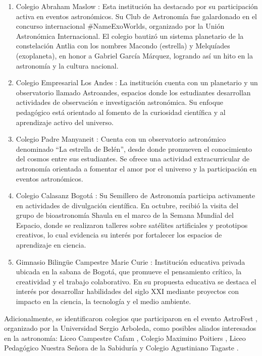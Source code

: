 \begin{enumerate}
  \item Colegio Abraham Maslow \cite{maslowweb}:
    Esta institución ha destacado por su participación activa en eventos
    astronómicos.
    Su Club de Astronomía fue galardonado en el concurso internacional
    \#NameExoWorlds, organizado por la Unión Astronómica Internacional.
    El colegio bautizó un sistema planetario de la constelación Antlia con los
    nombres Macondo (estrella) y Melquíades (exoplaneta), en honor a Gabriel
    García Márquez, logrando así un hito en la astronomía y la cultura nacional.

  \item Colegio Empresarial Los Andes \cite{astroandes}:
    La institución cuenta con un planetario y un observatorio llamado
    Astroandes, espacios donde los estudiantes desarrollan actividades de
    observación e investigación astronómica.
    Su enfoque pedagógico está orientado al fomento de la curiosidad científica
    y al aprendizaje activo del universo.

  \item Colegio Padre Manyaneit \cite{manyanetweb}:
    Cuenta con un observatorio astronómico
    denominado ``La estrella de Belén'', desde donde promueven el conocimiento
    del cosmos entre sus estudiantes.
    Se ofrece una actividad extracurricular de astronomía orientada a fomentar
    el amor por el universo y la participación en eventos astronómicos.

  \item Colegio Calasanz Bogotá \cite{calasanzastro}:
    Su Semillero de Astronomía participa activamente en actividades de
    divulgación científica.
    En octubre, recibió la visita del grupo de bioastronomía Shaula en el marco
    de la Semana Mundial del Espacio, donde se realizaron talleres sobre
    satélites artificiales y prototipos creativos, lo cual evidencia su interés
    por fortalecer los espacios de aprendizaje en ciencia.

  \item Gimnasio Bilingüe Campestre Marie Curie \cite{mariecurieweb}:
    Institución educativa privada ubicada en la sabana de Bogotá, que promueve
    el pensamiento crítico, la creatividad y el trabajo colaborativo.
    En su propuesta educativa se destaca el interés por desarrollar habilidades
    del siglo XXI mediante proyectos con impacto en la ciencia, la tecnología y
    el medio ambiente.
\end{enumerate}

Adicionalmente, se identificaron colegios que participaron en el evento AstroFest
\cite{astrofest2023}, organizado por la Universidad Sergio Arboleda,
como posibles aliados interesados en la astronomía: Liceo Campestre Cafam \cite{liceocafamweb},
Colegio Maximino Poitiers \cite{maximinoweb}, Liceo Pedagógico Nuestra Señora
de la Sabiduría \cite{sabiduriaweb} y Colegio Agustiniano Tagaste \cite{agustiniano_tagaste}.
